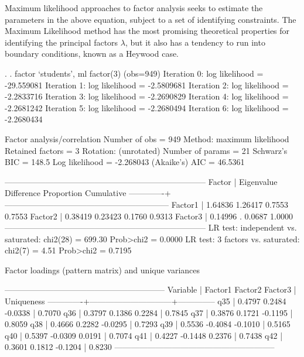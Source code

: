 \documentclass[12pt]{article}
\begin{document}
Maximum likelihood approaches to factor analysis seeks to estimate the
parameters in the above equation, subject to a set of identifying
constraints. The Maximum Likelihood method has the most promising
theoretical properties for identifying the principal factors
$\lambda$, but it also has a tendency to run into boundary conditions,
known as a Heywood case. 

    \begin{stlog}
. 
.   factor `students', ml factor(3)
(obs=949)
Iteration 0:   log likelihood = -29.559081
Iteration 1:   log likelihood = -2.5809681
Iteration 2:   log likelihood = -2.2833716
Iteration 3:   log likelihood = -2.2690829
Iteration 4:   log likelihood = -2.2681242
Iteration 5:   log likelihood = -2.2680494
Iteration 6:   log likelihood = -2.2680434

Factor analysis/correlation                        Number of obs    =      949
    Method: maximum likelihood                     Retained factors =        3
    Rotation: (unrotated)                          Number of params =       21
                                                   Schwarz's BIC    =    148.5
    Log likelihood = -2.268043                     (Akaike's) AIC   =  46.5361

    --------------------------------------------------------------------------
         Factor  |   Eigenvalue   Difference        Proportion   Cumulative
    -------------+------------------------------------------------------------
        Factor1  |      1.64836      1.26417            0.7553       0.7553
        Factor2  |      0.38419      0.23423            0.1760       0.9313
        Factor3  |      0.14996            .            0.0687       1.0000
    --------------------------------------------------------------------------
    LR test: independent vs. saturated:  chi2(28) =  699.30 Prob>chi2 = 0.0000
    LR test:   3 factors vs. saturated:  chi2(7)  =    4.51 Prob>chi2 = 0.7195

Factor loadings (pattern matrix) and unique variances

    -----------------------------------------------------------
        Variable |  Factor1   Factor2   Factor3 |   Uniqueness 
    -------------+------------------------------+--------------
             q35 |   0.4797    0.2484   -0.0338 |      0.7070  
             q36 |   0.3797    0.1386    0.2284 |      0.7845  
             q37 |   0.3876    0.1721   -0.1195 |      0.8059  
             q38 |   0.4666    0.2282   -0.0295 |      0.7293  
             q39 |   0.5536   -0.4084   -0.1010 |      0.5165  
             q40 |   0.5397   -0.0309    0.0191 |      0.7074  
             q41 |   0.4227   -0.1448    0.2376 |      0.7438  
             q42 |   0.3601    0.1812   -0.1204 |      0.8230  
    -----------------------------------------------------------

    \end{stlog}
\end{document}
